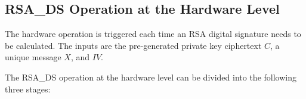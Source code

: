 \documentclass[main\_\_EN.tex]{subfiles}
\begin{document}
\subsection{RSA\_DS Operation at the Hardware Level}
\label{sec:digsig-hardware-level-operation}

The hardware operation is triggered each time an RSA digital signature needs to be calculated. The inputs are the pre-generated private key ciphertext \begin{math}C\end{math}, a unique message \begin{math}X\end{math}, and \begin{math}IV\end{math}.

The RSA\_DS operation at the hardware level can be divided into the following three stages:
\end{document}
